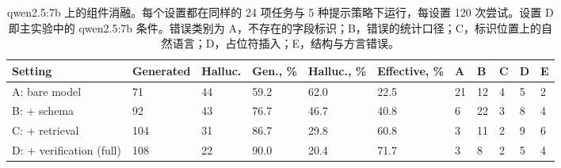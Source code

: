 \documentclass[11pt,a4paper]{article}
\begin{document}
\begin{table}[H]
\caption{qwen2.5:7b 上的组件消融。每个设置都在同样的 24 项任务与 5 种提示策略下运行，每设置 120 次尝试。设置 D 即主实验中的 qwen2.5:7b 条件。错误类别为 A，不存在的字段标识；B，错误的统计口径；C，标识位置上的自然语言；D，占位符插入；E，结构与方言错误。}
\label{tab:ablation}
\centering
\footnotesize
\setlength{\tabcolsep}{4pt}
\begin{tabular*}{\linewidth}{@{\extracolsep{\fill}}lllllllllll@{}}
\toprule
Setting & Generated & Halluc. & Gen., \% & Halluc., \% & Effective, \% & A & B & C & D & E\\
\midrule
A: bare model            & 71  & 44 & 59.2 & 62.0 & 22.5 & 21 & 12 & 4 & 5 & 2\\
B: + schema              & 92  & 43 & 76.7 & 46.7 & 40.8 & 6  & 22 & 3 & 8 & 4\\
C: + retrieval           & 104 & 31 & 86.7 & 29.8 & 60.8 & 3  & 11 & 2 & 9 & 6\\
D: + verification (full) & 108 & 22 & 90.0 & 20.4 & 71.7 & 3  & 8  & 2 & 5 & 4\\
\bottomrule
\end{tabular*}
\end{table}
\end{document}
